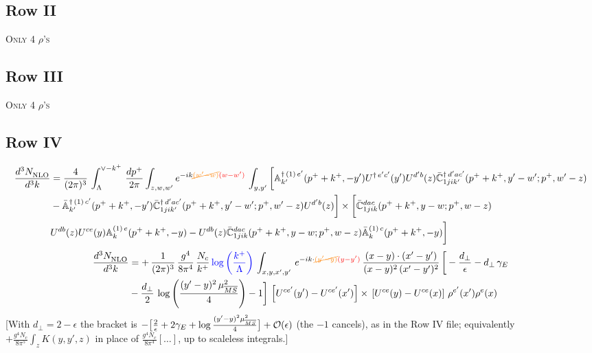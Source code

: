 \documentclass[9pt]{article}
\def\mf#1{\mathbb{#1}}
\numberwithin{equation}{section}
\begin{document}
\subsection{Row II}
\textsc{Only 4 $\rho$'s}
\subsection{Row III}
\textsc{Only 4 $\rho$'s}
\subsection{Row IV}
\begin{align}
    \frac{d^{3}N_{\rm NLO}^{\rm}}{d^{3}k}  & = \frac{4}{(2\pi)^{3}}\,\int_{\Lambda}^{\vee-k^{+}}\, \frac{dp^{+}}{2\pi}\int_{z,w,w^{\prime}} e^{-ik{\color{orange}\cancel{(w^{\prime}-w)}}{\color{red}(w-w^{\prime})}}\,  \int_{y,y^{\prime}}\bigg[\mf{A}^{\dagger\, (1)\,e^{\prime}}_{k^{\prime}}(p^{+}+k^{+},-y^{\prime})U^{\dagger\, e^{\prime}c^{\prime}}(y^{\prime})U^{d^{\prime}b}(z) \Bar{\mf{C}}^{\dagger\, d^{\prime}ac^{\prime}}_{1jik^{\prime}}(p^{+}+k^{+},y^{\prime}-w^{\prime}; p^{+},w^{\prime}-z) \notag \\ &  -\Bar{\mf{A}}^{\dagger\, (1)\,c^{\prime}}_{k^{\prime}}(p^{+}+k^{+},-y^{\prime}) \Bar{\mf{C}}^{\dagger\, d^{\prime}ac^{\prime}}_{1jik^{\prime}}(p^{+}+k^{+},y^{\prime}-w^{\prime}; p^{+},w^{\prime}-z)U^{d^{\prime}b}(z)\bigg]\times\bigg[\Bar{\mf{C}}^{dac}_{1jik}(p^{+}+k^{+},y-w; p^{+},w-z)\notag \\ & U^{db}(z)U^{ce}(y) \mf{A}^{(1)\,e}_{k}(p^{+}+k^{+},-y) -U^{db}(z) \Bar{\mf{C}}^{dac}_{1jik}(p^{+}+k^{+},y-w; p^{+},w-z)\Bar{\mf{A}}^{(1)\,c}_{k}(p^{+}+k^{+},-y)\bigg]\nonumber
\end{align}
\begin{align}
    \frac{d^{3}N_{\rm NLO}^{\rm}}{d^{3}k}  & =  +\,\frac{1}{(2\pi)^{3}}\,\frac{g^{4}}{8\pi^{4}}\, \frac{N_{c}}{k^{+}}\,{\color{blue}\log{\left(\frac{k^{+}}{\Lambda}\right)}}\,\int_{x,y,x',y'}\,e^{-ik\cdot {\color{orange}\cancel{(y'-y)}}{\color{red}(y-y')}}\,\frac{(x-y)\cdot (x'-y')}{(x-y)^{2}\,(x'-y')^{2}}\,\bigg[-\frac{d_{\perp}}{\epsilon}-d_{\perp}\,\gamma_{E}\notag \\ & -\frac{d_{\perp}}{2}\,\log{\left(\frac{(y'-y)^{2}\,\mu^{2}_{\overline{MS}}}{4}\right)}-1\bigg]\,\left[U^{ce'}(y') - U^{ce'}(x')\right] \times\, \left[U^{ce}(y) - U^{ce}(x)\right]\, \rho^{e'}(x') \rho^{e}(x)
\end{align} {\color{red}[With $d_{\perp}=2-\epsilon$ the bracket is $-\big[\frac{2}{\epsilon}+2\gamma_{E}+\log\frac{(y'-y)^{2}\mu^{2}_{\overline{MS}}}{4}\big]+{\cal O}(\epsilon)$ (the $-1$ cancels), as in the Row IV file; equivalently $+\frac{g^{4}N_{c}}{8\pi^{5}}\int_{z}K(y,y',z)$ in place of $\frac{g^{4}N_{c}}{8\pi^{4}}[\dots]$, up to scaleless integrals.]}\par\noindent
\end{document}
